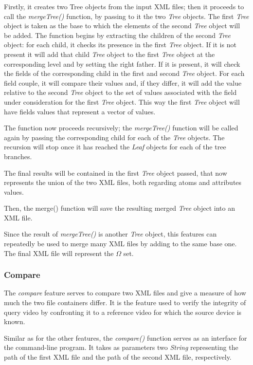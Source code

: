 Firstly, it creates two Tree objects from the input XML files; then it proceeds to call the \emph{mergeTree()} function, by passing to it the two \emph{Tree} objects. The first \emph{Tree} object is taken as the base to which the elements of the second \emph{Tree} object will be added. The function begins by extracting the children of the second \emph{Tree} object: for each child, it checks its presence in the first \emph{Tree} object.
If it is not present it will add that child \emph{Tree} object to the first \emph{Tree} object at the corresponding level and by setting the right father.
If it is present, it will check the fields of the corresponding child in the first and second \emph{Tree} object. For each field couple, it will compare their values and, if they differ, it will add the value relative to the second \emph{Tree} object to the set of values associated with the field under consideration for the first \emph{Tree} object. This way the first \emph{Tree} object will have fields values that represent a vector of values.

The function now proceeds recursively; the \emph{mergeTree()} function will be called again by passing the corresponding child for each of the \emph{Tree} objects. The recursion will stop once it has reached the \emph{Leaf} objects for each of the tree branches.

The final results will be contained in the first \emph{Tree} object passed, that now represents the union of the two XML files, both regarding atoms and attributes values.

Then, the merge() function will save the resulting merged \emph{Tree} object into an XML file.

Since the result of \emph{mergeTree()} is another \emph{Tree} object, this features can repeatedly be used to merge many XML files by adding to the same base one. The final XML file will represent the $\Omega$ set.

\subsubsection*{Compare}

The \emph{compare} feature serves to compare two XML files and give a measure of how much the two file containers differ. It is the feature used to verify the integrity of query video by confronting it to a reference video for which the source device is known.

Similar as for the other features, the \emph{compare()} function serves as an interface for the command-line program. It takes as parameters two \emph{String} representing the path of the first XML file and the path of the second XML file, respectively.

